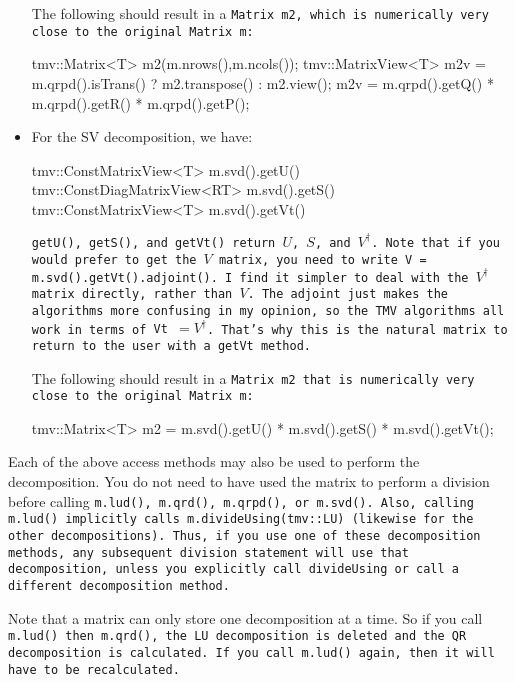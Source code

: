 \begin{itemize}
The following should result in a \tt{Matrix m2}, which is numerically very close to
the original \tt{Matrix m}:
\begin{tmvcode}
tmv::Matrix<T> m2(m.nrows(),m.ncols());
tmv::MatrixView<T> m2v = 
      m.qrpd().isTrans() ? m2.transpose() : m2.view();
m2v = m.qrpd().getQ() * m.qrpd().getR() * m.qrpd().getP();
\end{tmvcode}

\item
For the SV decomposition, we have:
\begin{tmvcode}
tmv::ConstMatrixView<T> m.svd().getU()
tmv::ConstDiagMatrixView<RT> m.svd().getS()
tmv::ConstMatrixView<T> m.svd().getVt()
\end{tmvcode}
\tt{getU()}, \tt{getS()}, and \tt{getVt()} return $U$, $S$, and $V^\dagger$.  Note that if you would prefer to get the $V$ matrix, you need to write \tt{V = m.svd().getVt().adjoint()}.  I find it simpler to deal with the $V^\dagger$ matrix directly, rather than $V$.  The adjoint just makes the algorithms more confusing in my opinion, so the TMV algorithms all work in terms of \tt{Vt} $= V^\dagger$.  That's why this is the natural matrix to return to the user with a \tt{getVt} method.

The following should result in a \tt{Matrix m2}
that is numerically very close to the original \tt{Matrix m}:
\begin{tmvcode}
tmv::Matrix<T> m2 = m.svd().getU() * m.svd().getS() * m.svd().getVt();
\end{tmvcode}
\end{itemize}

Each of the above access methods may also be used to perform the decomposition.
You do not need to have used the matrix to perform a division before
calling \tt{m.lud()}, \tt{m.qrd()}, \tt{m.qrpd()}, or \tt{m.svd()}.  Also, calling
\tt{m.lud()} implicitly calls \tt{m.divideUsing(tmv::LU)} (likewise for the other 
decompositions).  Thus, if you use one of these decomposition methods, any
subsequent division statement will use that decomposition, unless you explicitly
call \tt{divideUsing} or call a different decomposition method.

Note that a matrix can only store one decomposition at a time.  So if you 
call \tt{m.lud()} then \tt{m.qrd()}, the LU decomposition is deleted
and the QR decomposition is calculated.  If you call \tt{m.lud()} again, then 
it will have to be recalculated.


